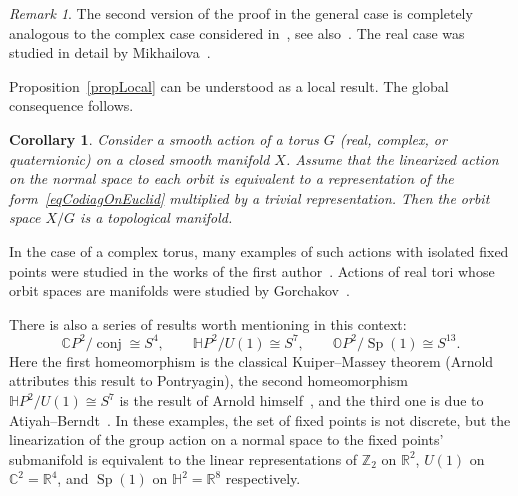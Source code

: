 \documentclass[english, 12pt]{amsproc}
\newcounter{stmcounter}[section]
\numberwithin{equation}{section}
\theoremstyle{plain}
\newtheorem{cor}[stmcounter]{Corollary}
\theoremstyle{definition}
\theoremstyle{remark}
\newtheorem{rem}[stmcounter]{Remark}
\DeclareMathOperator{\Sp}{Sp}
\DeclareMathOperator{\conj}{conj}
\newcommand{\Zo}{\mathbb{Z}}
\newcommand{\Ro}{\mathbb{R}}
\newcommand{\Co}{\mathbb{C}}
\newcommand{\Ho}{\mathbb{H}}
\newcommand{\Zt}{\Zo_2}
\newcommand{\CP}{\mathbb{C}P}
\newcommand{\HP}{\mathbb{H}P}
\newcommand{\OP}{\mathbb{O}P}
\begin{document}
\begin{rem}\label{remComplexAndReal}
The second version of the proof in the general case is completely analogous to the complex case considered in~\cite[Lem.2.11]{AyzCompl}, see also~\cite[Thm.3.6]{Styrt}. The real case was studied in detail by Mikhailova~\cite[Thm.2.2]{Mikh}.
\end{rem}


Proposition~\ref{propLocal} can be understood as a local result. The global consequence follows.

\begin{cor}\label{corOrbitGlobal}
Consider a smooth action of a torus $G$ (real, complex, or quaternionic) on a closed smooth manifold $X$. Assume that the linearized action on the normal space to each orbit is equivalent to a representation of the form~\eqref{eqCodiagOnEuclid} multiplied by a trivial representation. Then the orbit space $X/G$ is a topological manifold.
\end{cor}

In the case of a complex torus, many examples of such actions with isolated fixed points were studied in the works of the first author~\cite{AyzCompl,AyzHP,AyzMasEquiv}. Actions of real tori whose orbit spaces are manifolds were studied by Gorchakov~\cite{Gorch}.

There is also a series of results worth mentioning in this context:
\begin{equation}\label{eqAtiyahArnold}
\CP^2/\conj\cong S^4,\qquad \HP^2/U(1)\cong S^7,\qquad \OP^2/\Sp(1)\cong S^{13}.
\end{equation}
Here the first homeomorphism is the classical Kuiper--Massey theorem (Arnold~\cite{Arn} attributes this result to Pontryagin), the second homeomorphism $\HP^2/U(1)\cong S^7 $ is the result of Arnold himself~\cite[Ex.4]{Arn}, and the third one is due to Atiyah--Berndt~\cite{AtBer}. In these examples, the set of fixed points is not discrete, but the linearization of the group action on a normal space to the fixed points' submanifold is equivalent to the linear representations of $\Zt$ on $\Ro^2$, $U(1)$ on $\Co^2=\Ro^4$, and $\Sp(1)$ on $\Ho^2 =\Ro^8$ respectively.
\end{document}
